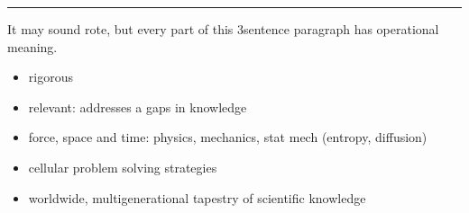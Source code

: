 \documentclass[letterpaper,10pt,english]{sphinxmanual}
\begin{document}
\bigskip\hrule\bigskip


\sphinxAtStartPar
It may sound rote, but every part of this 3\sphinxhyphen{}sentence paragraph has operational meaning.
\begin{itemize}
\item {} 
\sphinxAtStartPar
rigorous

\item {} 
\sphinxAtStartPar
relevant: addresses a gaps in knowledge

\item {} 
\sphinxAtStartPar
force, space and time: physics, mechanics, stat mech (entropy, diffusion)

\item {} 
\sphinxAtStartPar
cellular problem solving strategies

\item {} 
\sphinxAtStartPar
worldwide, multi\sphinxhyphen{}generational tapestry of scientific knowledge

\end{itemize}
\end{document}
